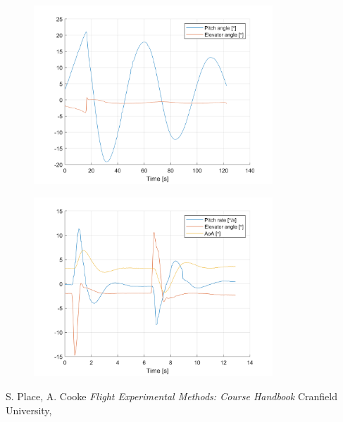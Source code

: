 \documentclass{article}
\begin{document}
\begin{figure}[H]
  \centering
  \includegraphics[width=0.8\textwidth]{figures/Phugoid.png}
  \caption{}
  \label{fig:phugoid}
\end{figure}

\begin{figure}[H]
  \centering
  \includegraphics[width=0.8\textwidth]{figures/SPO.png}
  \caption{}
  \label{fig:spo}
\end{figure}

\begin{thebibliography}{9}

  S. Place, A. Cooke
  \emph{Flight Experimental Methods: Course Handbook}
  Cranfield University,

\end{thebibliography}
\end{document}
